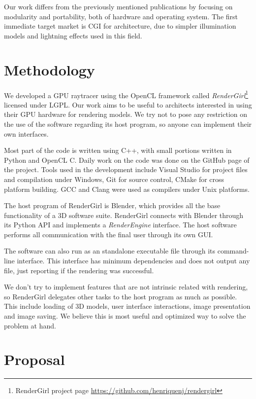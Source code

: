\documentclass[a4paper]{sbgames}               %
\begin{document}
Our work differs from the previously mentioned publications by
focusing on modularity and portability, both of hardware and operating
system. The first immediate target market is CGI for architecture, due
to simpler illumination models and lightning effects used in this
field.

\section{Methodology}
\label{sec:methodology}

We developed a GPU raytracer using the OpenCL framework called
\emph{RenderGirl}\footnote{RenderGirl project page
\url{https://github.com/henriquenj/rendergirl}} licensed under
LGPL. Our work aims to be useful to architects interested in using
their GPU hardware for rendering models. We try not to pose any
restriction on the use of the software regarding its host program, so
anyone can implement their own interfaces.

Most part of the code is written using C++, with small portions
written in Python and OpenCL C. Daily work on the code was done on the
GitHub page of the project. Tools used in the
development include Visual Studio for project files and compilation
under Windows, Git for source control, CMake for cross platform
building. GCC and Clang were used as compilers under Unix platforms.

The host program of RenderGirl is Blender, which provides all the base
functionality of a 3D software suite. RenderGirl connects with Blender
through its Python API and implements a \emph{RenderEngine}
interface. The host software performs all communication with the final
user through its own GUI.

The software can also run as an standalone executable file through its
command-line interface. This interface has minimum dependencies and
does not output any file, just reporting if the rendering was successful.

We don't try to implement features that are not intrinsic related with
rendering, so RenderGirl delegates other tasks to the host program as
much as possible. This include loading of 3D models, user interface
interactions, image presentation and image saving. We believe this is
most useful and optimized way to solve the problem at hand.

\section{Proposal}
\end{document}
